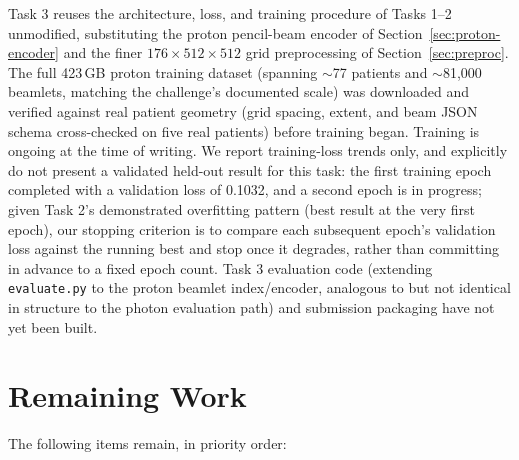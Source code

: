 \documentclass[10pt,conference]{IEEEtran}
\begin{document}
Task 3 reuses the architecture, loss, and training procedure of Tasks
1--2 unmodified, substituting the proton pencil-beam encoder of
Section~\ref{sec:proton-encoder} and the finer $176\times512\times512$
grid preprocessing of Section~\ref{sec:preproc}. The full 423\,GB
proton training dataset (spanning $\sim$77 patients and $\sim$81{,}000
beamlets, matching the challenge's documented scale) was downloaded and
verified against real patient geometry (grid spacing, extent, and beam
JSON schema cross-checked on five real patients) before training began.
Training is ongoing at the time of writing. We report training-loss
trends only, and explicitly do not present a validated held-out result
for this task: the first training epoch completed with a validation
loss of 0.1032, and a second epoch is in progress; given Task 2's
demonstrated overfitting pattern (best result at the very first epoch),
our stopping criterion is to compare each subsequent epoch's validation
loss against the running best and stop once it degrades, rather than
committing in advance to a fixed epoch count. Task 3 evaluation code
(extending \texttt{evaluate.py} to the proton beamlet index/encoder,
analogous to but not identical in structure to the photon evaluation
path) and submission packaging have not yet been built.

\section{Remaining Work}
\label{sec:remaining}

The following items remain, in priority order:
\end{document}
